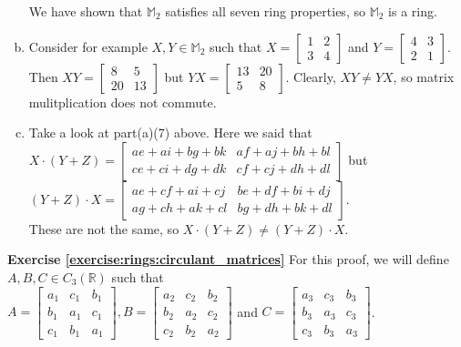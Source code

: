 \begin{enumerate}[(a)]
We have shown that ${\mathbb M}_2$ satisfies all seven ring properties, so ${\mathbb M}_2$ is a ring.
\item Consider for example $X,Y\in{\mathbb M}_2$ such that $X=
\begin{bmatrix}
1 & 2\\
3 & 4
\end{bmatrix}$ and $Y=
\begin{bmatrix}
4 & 3\\
2 & 1
\end{bmatrix}$.  Then $XY=
\begin{bmatrix}
8 & 5\\
20 & 13
\end{bmatrix}$
but $YX=
\begin{bmatrix}
13 & 20\\
5 & 8
\end{bmatrix}$.
Clearly, $XY\neq YX$, so matrix mulitplication does not commute.
\item Take a look at part(a)(7) above.  Here we said that\\ 
$X\cdot(Y+Z)=
\begin{bmatrix}
ae+ai+bg+bk & af+aj+bh+bl\\
ce+ci+dg+dk & cf+cj+dh+dl
\end{bmatrix}$ but\\ $(Y+Z)\cdot X=
\begin{bmatrix}
ae+cf+ai+cj & be+df+bi+dj\\
ag+ch+ak+cl & bg+dh+bk+dl
\end{bmatrix}$.\\
These are not the same, so $X\cdot(Y+Z)\neq(Y+Z)\cdot X$.
\end{enumerate}

\noindent\textbf{Exercise \ref{exercise:rings:circulant_matrices}}
For this proof, we will define $A,B,C\in C_3({\mathbb R})$ such that\\
$A=
\begin{bmatrix}
a_1 & c_1 & b_1\\
b_1 & a_1 & c_1\\
c_1 & b_1 & a_1
\end{bmatrix},
B=
\begin{bmatrix}
a_2 & c_2 & b_2\\
b_2 & a_2 & c_2\\
c_2 & b_2 & a_2
\end{bmatrix}$ 
and $C=
\begin{bmatrix}
a_3 & c_3 & b_3\\
b_3 & a_3 & c_3\\
c_3 & b_3 & a_3
\end{bmatrix}$.

